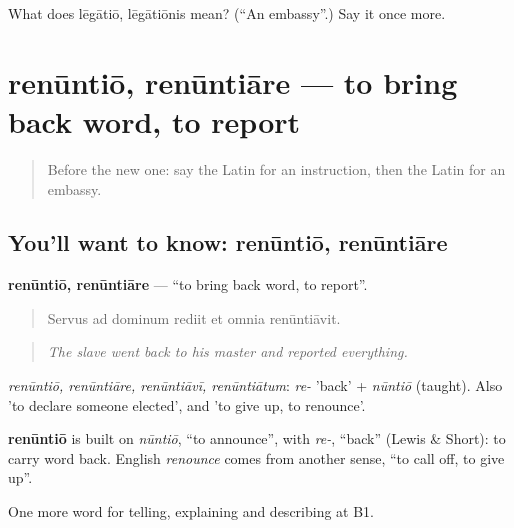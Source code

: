 \begin{tcolorbox}[breakable,colback=teal!4,colframe=teal!35!black,title={Before you move on}]
What does lēgātiō, lēgātiōnis mean? (\textquotedblleft{}An embassy\textquotedblright{}.) Say it once more.
\end{tcolorbox}
\section[renūntiō, renūntiāre]{renūntiō, renūntiāre — to bring back word, to report}

\label{lesson:LA-C300-renuntio}



\begin{quote}
Before the new one: say the Latin for an instruction, then the Latin for an embassy.
\end{quote}

\subsection*{You'll want to know: renūntiō, renūntiāre}
\textbf{renūntiō, renūntiāre} — \textquotedblleft{}to bring back word, to report\textquotedblright{}.

\begin{quote}
Servus ad dominum rediit et omnia renūntiāvit.
\end{quote}

\begin{quote}
\emph{The slave went back to his master and reported everything.}
\end{quote}

\emph{renūntiō, renūntiāre, renūntiāvī, renūntiātum}: \emph{re-} 'back' + \emph{nūntiō} (taught). Also 'to declare someone elected', and 'to give up, to renounce'.

\begin{cousinweb}
\textbf{renūntiō} is built on \emph{nūntiō}, \textquotedblleft{}to announce\textquotedblright{}, with \emph{re-}, \textquotedblleft{}back\textquotedblright{} (Lewis \& Short): to carry word back. English \emph{renounce} comes from another sense, \textquotedblleft{}to call off, to give up\textquotedblright{}.
\end{cousinweb}

\begin{grammarlens}[title={What you've built}]
One more word for telling, explaining and describing at B1.
\end{grammarlens}

